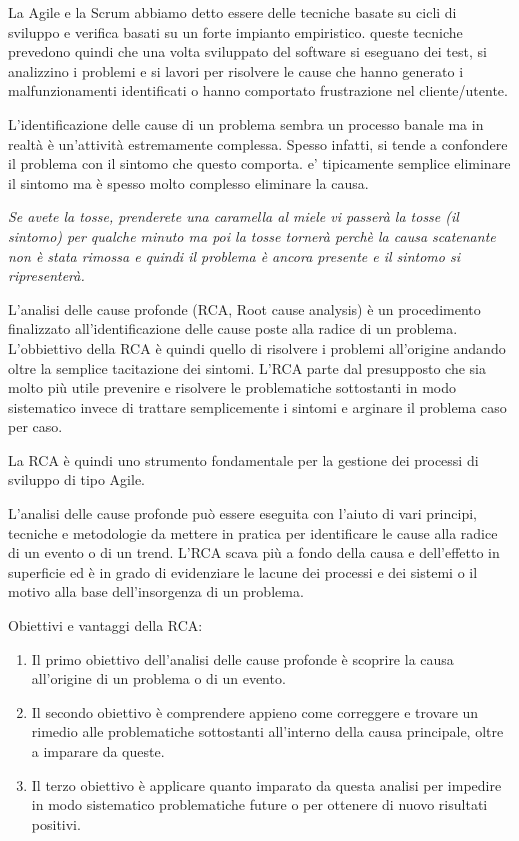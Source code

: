 La Agile e la Scrum abbiamo detto essere delle tecniche basate su cicli di sviluppo e verifica basati su un forte impianto empiristico. queste tecniche prevedono quindi che una volta sviluppato del software si eseguano dei test, si analizzino i problemi e si lavori per risolvere le cause che hanno generato i malfunzionamenti identificati o hanno comportato frustrazione nel cliente/utente.

L'identificazione delle cause di un problema sembra un processo banale ma in realtà è un'attività estremamente complessa. Spesso infatti, si tende a confondere il problema con il sintomo che questo comporta. e' tipicamente semplice eliminare il sintomo ma è spesso molto complesso eliminare la causa.

\textit{Se avete la tosse, prenderete una caramella al miele vi passerà la tosse (il sintomo) per qualche minuto ma poi la tosse tornerà perchè la causa scatenante non è stata rimossa e quindi il problema è ancora presente e il sintomo si ripresenterà.}

L'analisi delle cause profonde (RCA, Root cause analysis) è un procedimento finalizzato all'identificazione delle cause poste alla radice di un problema. L'obbiettivo della RCA è quindi quello di risolvere i problemi all'origine andando oltre la semplice tacitazione dei sintomi. L'RCA parte dal presupposto che sia molto più utile prevenire e risolvere le problematiche sottostanti in modo sistematico invece di trattare semplicemente i sintomi e arginare il problema caso per caso.

La RCA è quindi uno strumento fondamentale per la gestione dei processi di sviluppo di tipo Agile.

L'analisi delle cause profonde può essere eseguita con l'aiuto di vari principi, tecniche e metodologie da mettere in pratica per identificare le cause alla radice di un evento o di un trend. L'RCA scava più a fondo della causa e dell'effetto in superficie ed è in grado di evidenziare le lacune dei processi e dei sistemi o il motivo alla base dell'insorgenza di un problema.

Obiettivi e vantaggi della RCA:
\begin{enumerate}
    \item Il primo obiettivo dell'analisi delle cause profonde è scoprire la causa all'origine di un problema o di un evento.
    \item Il secondo obiettivo è comprendere appieno come correggere e trovare un rimedio alle problematiche sottostanti all'interno della causa principale, oltre a imparare da queste.
    \item Il terzo obiettivo è applicare quanto imparato da questa analisi per impedire in modo sistematico problematiche future o per ottenere di nuovo risultati positivi.

\end{enumerate}

